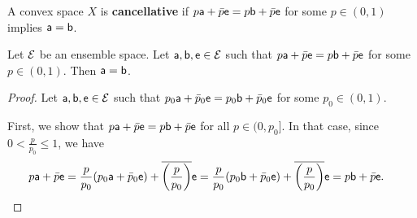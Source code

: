 \begin{mathSection}
\begin{defn}
	A convex space $X$ is \textbf{cancellative} if $p \ens[a] + \bar{p} \ens = p \ens[b] + \bar{p} \ens$ for some $p \in (0,1)$ implies $\ens[a] = \ens[b]$.
\end{defn}

\begin{thrm}
	Let $\Ens$ be an ensemble space. Let $\ens[a], \ens[b], \ens \in \Ens$ such that $p\ens[a] + \bar{p} \ens = p \ens[b] + \bar{p} \ens$ for some $p \in (0,1)$. Then $\ens[a] = \ens[b]$.
\end{thrm}

\begin{proof}
	Let $\ens[a], \ens[b], \ens \in \Ens$ such that $p_0\ens[a] + \bar{p}_0 \ens = p_0 \ens[b] + \bar{p}_0 \ens$ for some $p_0 \in (0,1)$.
	
	First, we show that $p\ens[a] + \bar{p} \ens = p \ens[b] + \bar{p} \ens$ for all $p \in (0,p_0]$. In that case, since $0 < \frac{p}{p_0} \leq 1$, we have
	\begin{equation}
		\begin{aligned}
			p \ens[a] + \bar{p} \ens &= \frac{p}{p_0} (p_0 \ens[a] + \bar{p}_0 \ens) + \overline{\left(\frac{p}{p_0}\right)} \ens = \frac{p}{p_0} (p_0 \ens[b] + \bar{p}_0 \ens) + \overline{\left(\frac{p}{p_0}\right)} \ens = p \ens[b] + \bar{p} \ens.
		\end{aligned}
	\end{equation}
	

\end{proof}
\end{mathSection}
